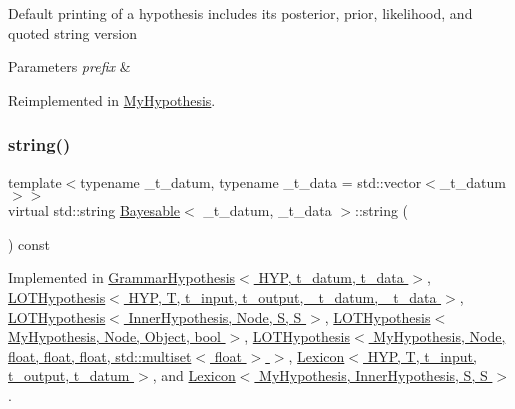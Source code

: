 Default printing of a hypothesis includes its posterior, prior, likelihood, and quoted string version 
\begin{DoxyParams}{Parameters}
{\em prefix} & \\
\hline
\end{DoxyParams}


Reimplemented in \hyperlink{class_my_hypothesis_a682dcd62d83189eae855d6aa4a40b0e0}{My\+Hypothesis}.

\mbox{\label{class_bayesable_a2ec58e98bf37a90ac3d45a7713c6d5ea}} 
\subsubsection{\texorpdfstring{string()}{string()}}
{\footnotesize\ttfamily template$<$typename \+\_\+t\+\_\+datum, typename \+\_\+t\+\_\+data = std\+::vector$<$\+\_\+t\+\_\+datum$>$$>$ \\
virtual std\+::string \hyperlink{class_bayesable}{Bayesable}$<$ \+\_\+t\+\_\+datum, \+\_\+t\+\_\+data $>$\+::string (\begin{DoxyParamCaption}{ }\end{DoxyParamCaption}) const\hspace{0.3cm}{\ttfamily [pure virtual]}}



Implemented in \hyperlink{class_grammar_hypothesis_a75267d7b68cd9b3634f84a464877c07c}{Grammar\+Hypothesis$<$ H\+Y\+P, t\+\_\+datum, t\+\_\+data $>$}, \hyperlink{class_l_o_t_hypothesis_a0a82849305c4718f4406f7a8c13fbfa7}{L\+O\+T\+Hypothesis$<$ H\+Y\+P, T, t\+\_\+input, t\+\_\+output, \+\_\+t\+\_\+datum, \+\_\+t\+\_\+data $>$}, \hyperlink{class_l_o_t_hypothesis_a0a82849305c4718f4406f7a8c13fbfa7}{L\+O\+T\+Hypothesis$<$ Inner\+Hypothesis, Node, S, S $>$}, \hyperlink{class_l_o_t_hypothesis_a0a82849305c4718f4406f7a8c13fbfa7}{L\+O\+T\+Hypothesis$<$ My\+Hypothesis, Node, Object, bool $>$}, \hyperlink{class_l_o_t_hypothesis_a0a82849305c4718f4406f7a8c13fbfa7}{L\+O\+T\+Hypothesis$<$ My\+Hypothesis, Node, float, float, float, std\+::multiset$<$ float $>$ $>$}, \hyperlink{class_lexicon_a25895445cc5f7337e299e8d9dd14822c}{Lexicon$<$ H\+Y\+P, T, t\+\_\+input, t\+\_\+output, t\+\_\+datum $>$}, and \hyperlink{class_lexicon_a25895445cc5f7337e299e8d9dd14822c}{Lexicon$<$ My\+Hypothesis, Inner\+Hypothesis, S, S $>$}.



